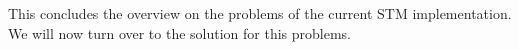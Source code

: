 This concludes the overview on the problems of the current STM implementation. We will now turn over to the 
solution for this problems.







% 
% 

